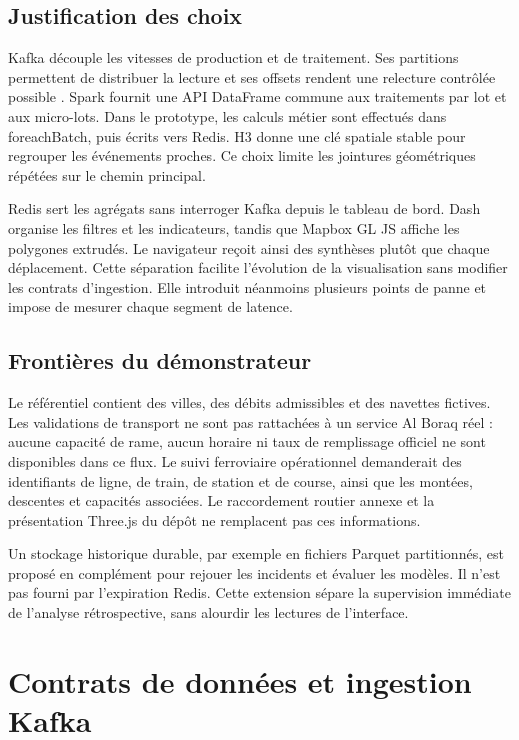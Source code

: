 \documentclass[a4paper,11pt]{article}
\begin{document}
\subsection{Justification des choix}
Kafka découple les vitesses de production et de traitement. Ses partitions permettent de distribuer la lecture et ses offsets rendent une relecture contrôlée possible \cite{ref3}. Spark fournit une API DataFrame commune aux traitements par lot et aux micro-lots. Dans le prototype, les calculs métier sont effectués dans {\small\ttfamily foreachBatch}, puis écrits vers Redis. H3 donne une clé spatiale stable pour regrouper les événements proches. Ce choix limite les jointures géométriques répétées sur le chemin principal.
\par
Redis sert les agrégats sans interroger Kafka depuis le tableau de bord. Dash organise les filtres et les indicateurs, tandis que Mapbox GL JS affiche les polygones extrudés. Le navigateur reçoit ainsi des synthèses plutôt que chaque déplacement. Cette séparation facilite l'évolution de la visualisation sans modifier les contrats d'ingestion. Elle introduit néanmoins plusieurs points de panne et impose de mesurer chaque segment de latence.
\par
\subsection{Frontières du démonstrateur}
Le référentiel contient des villes, des débits admissibles et des navettes fictives. Les validations de transport ne sont pas rattachées à un service Al Boraq réel : aucune capacité de rame, aucun horaire ni taux de remplissage officiel ne sont disponibles dans ce flux. Le suivi ferroviaire opérationnel demanderait des identifiants de ligne, de train, de station et de course, ainsi que les montées, descentes et capacités associées. Le raccordement routier annexe et la présentation Three.js du dépôt ne remplacent pas ces informations.
\par
Un stockage historique durable, par exemple en fichiers Parquet partitionnés, est proposé en complément pour rejouer les incidents et évaluer les modèles. Il n'est pas fourni par l'expiration Redis. Cette extension sépare la supervision immédiate de l'analyse rétrospective, sans alourdir les lectures de l'interface.
\par

\clearpage
\section{Contrats de données et ingestion Kafka}\label{sec:3}
\end{document}
